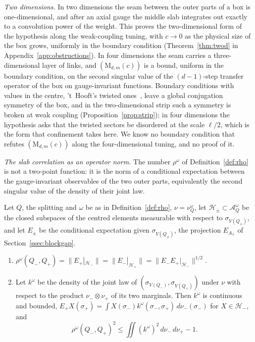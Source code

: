 \emph{Two dimensions.} In two dimensions the seam between the outer parts
of a box is one-dimensional, and after an axial gauge the middle slab
integrates out exactly to a convolution power of the weight. This proves the
two-dimensional form of the hypothesis along the weak-coupling tuning, with
$c\to0$ as the physical size of the box grows, uniformly in the boundary
condition (Theorem~\ref{thm:twod} in Appendix~\ref{app:obstructions}). In
four dimensions the seam carries a three-dimensional layer of links, and
$(\mathrm M_{d,m}(c))$ is a bound, uniform in the boundary condition, on the
second singular value of the $(d-1)$-step transfer operator of the box on
gauge-invariant functions. Boundary conditions with values in the centre,
't~Hooft's twisted ones~\cite{tH79}, leave a global conjugation symmetry of
the box, and in the two-dimensional strip such a symmetry is broken at weak
coupling (Proposition~\ref{prop:strip}); in four dimensions the hypothesis
asks that the twisted sectors be disordered at the scale $\ell/2$, which is
the form that confinement takes here. We know no boundary condition that
refutes $(\mathrm M_{d,m}(c))$ along the four-dimensional tuning, and no
proof of it.

\emph{The slab correlation as an operator norm.} The number $\rho^\omega$
of Definition~\ref{def:rho} is not a two-point function: it is the norm of
a conditional expectation between the gauge-invariant observables of the
two outer parts, equivalently the second singular value of the density of
their joint law.

\begin{proposition}\label{prop:rhonorm}
Let $Q$, the splitting and $\omega$ be as in Definition~\ref{def:rho},
$\nu=\nu^\omega_Q$, let $\mathcal H_\pm\subset\mathcal A^\omega_Q$ be the
closed subspaces of the centred elements measurable with respect to
$\sigma_{V(Q_\pm)}$, and let $E_\pm$ be the conditional expectation given
$\sigma_{V(Q_\pm)}$, the projection $E_{A_\mp}$ of
Section~\ref{ssec:blockgap}.
\begin{enumerate}[label=\textup{(\roman*)},leftmargin=*]
\item $\rho^\omega(Q_-,Q_+)=\|E_+|_{\mathcal H_-}\|=\|E_-|_{\mathcal H_+}\|
=\|E_-E_+|_{\mathcal H_-}\|^{1/2}$.
\item Let $k^\omega$ be the density of the joint law of $(\sigma_{V(Q_-)},
\sigma_{V(Q_+)})$ under $\nu$ with respect to the product $\nu_-\otimes
\nu_+$ of its two marginals. Then $k^\omega$ is continuous and bounded,
$E_+X(\sigma_+)=\int X(\sigma_-)k^\omega(\sigma_-,\sigma_+)\,d\nu_-(\sigma_-)$
for $X\in\mathcal H_-$, and
\[
\rho^\omega(Q_-,Q_+)^2\le\iint(k^\omega)^2\,d\nu_-\,d\nu_+-1 .
\]
\end{enumerate}
\end{proposition}

